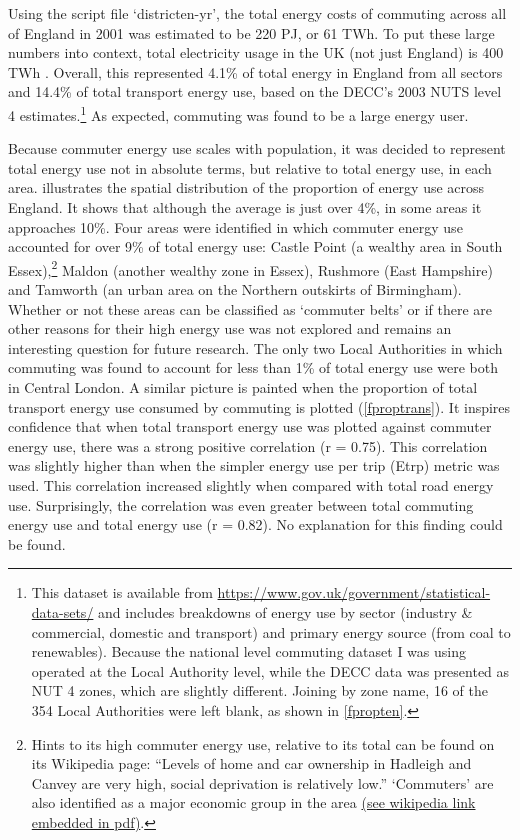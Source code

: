 Using the script file `districten-yr', the total energy costs of commuting
across all of England in 2001 was estimated to be 220 PJ, or 61 TWh.
To put these large numbers into context, total electricity usage in the UK
(not just England) is 400 TWh \citep{MacKay2009}. Overall, this represented
4.1\% of total energy in England from all sectors and 14.4\% of total transport
energy use, based on the DECC's 2003 NUTS level 4
estimates.\footnote{This
dataset is available from {\color{blue} \href{https://www.gov.uk/government/statistical-data-sets/total-final-energy-consumption-at-regional-and-local-authority level-2005-to-2010}{https://www.gov.uk/government/statistical-data-sets/}}
and includes breakdowns of energy use by sector (industry \& commercial, domestic and transport)
and primary energy source (from coal to renewables).
Because the national level commuting dataset I was using operated at the
Local Authority level, while the DECC data was presented as NUT 4 zones,
which are slightly different. Joining by zone name, 16 of the 354 Local
Authorities were left blank, as shown in \cref{fpropten}.
}
As expected, commuting was found to be a large energy user.

Because commuter energy use scales with population, it was decided to represent
total energy use not in absolute terms, but relative to total energy use,
in each area.  illustrates the spatial distribution of
the proportion of energy use across England. It shows that although the
average is just over 4\%, in some areas it approaches 10\%. Four areas
were identified in which commuter energy use accounted for over 9\% of total
energy use: Castle Point (a wealthy area in South
Essex),\footnote{Hints to its high commuter energy use, relative to its total
can be found on its Wikipedia page:
``Levels of home and car ownership in Hadleigh and Canvey are very high,
social deprivation is relatively low.'' `Commuters' are also
identified as a major economic group in the area {\color{blue}
\href{http://tinyurl.com/qfkb9ta}
{(see wikipedia link embedded in pdf)}}.
}
Maldon (another wealthy zone in Essex),
Rushmore (East Hampshire) and Tamworth (an urban area on the Northern
outskirts of Birmingham). Whether or not these areas can be classified as
`commuter belts' or if there are other reasons for their high energy use was
not explored and remains an interesting question for future research.
The only two Local Authorities in which commuting was found to account
for less than 1\% of total energy use were both in Central London.
A similar picture is painted when the proportion of total transport
energy use consumed by commuting is plotted (\cref{fproptrans}).
It inspires confidence that when total transport energy use was plotted
against commuter energy use, there was a strong positive correlation
(r = 0.75). This correlation was slightly higher than when
the simpler energy use per trip (Etrp) metric was used.
This correlation increased slightly when compared with
total road energy use. Surprisingly, the correlation
was even greater between total commuting energy use and total energy use
(r = 0.82). No explanation for this finding could be found.

